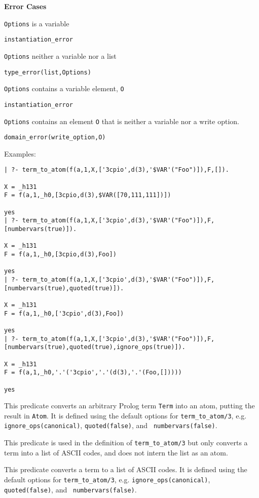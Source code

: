 \begin{description}
{\bf Error Cases} 
\bi
\item 	{\tt Options} is a variable
\bi
\item    {\tt instantiation\_error}
\ei
\item 	{\tt Options} neither a variable nor a list
\bi
\item    {\tt type\_error(list,Options)}
\ei
\item 	{\tt Options} contains a variable element, {\tt O}
\bi
\item    {\tt instantiation\_error}
\ei
\item 	{\tt Options} contains an element {\tt O} that is neither a variable
nor a write option.
\bi
\item    {\tt domain\_error(write\_option,O)}
\ei
\ei

Examples:
{\footnotesize
\begin{verbatim}
| ?- term_to_atom(f(a,1,X,['3cpio',d(3),'$VAR'("Foo")]),F,[]).

X = _h131
F = f(a,1,_h0,[3cpio,d(3),$VAR([70,111,111])])

yes
| ?- term_to_atom(f(a,1,X,['3cpio',d(3),'$VAR'("Foo")]),F,[numbervars(true)]).

X = _h131
F = f(a,1,_h0,[3cpio,d(3),Foo])

yes
| ?- term_to_atom(f(a,1,X,['3cpio',d(3),'$VAR'("Foo")]),F,[numbervars(true),quoted(true)]).

X = _h131
F = f(a,1,_h0,['3cpio',d(3),Foo])

yes
| ?- term_to_atom(f(a,1,X,['3cpio',d(3),'$VAR'("Foo")]),F,[numbervars(true),quoted(true),ignore_ops(true)]).

X = _h131
F = f(a,1,_h0,'.'('3cpio','.'(d(3),'.'(Foo,[]))))

yes
\end{verbatim}}

%
This predicate converts an arbitrary Prolog term {\tt Term} into an
atom, putting the result in {\tt Atom}.  It is defined using the
default options for {\tt term\_to\_atom/3}, e.g. {\tt
ignore\_ops(canonical)}, {\tt quoted(false)}, and {\tt
numbervars(false)}.

%
This predicate is used in the definition of {\tt term\_to\_atom/3} but
only converts a term into a list of ASCII codes, and does not intern
the list as an atom.

%
This predicate converts a term to a list of ASCII codes.  It is
defined using the default options for {\tt term\_to\_atom/3},
e.g. {\tt ignore\_ops(canonical)}, {\tt quoted(false)}, and {\tt
numbervars(false)}.


\end{description}
